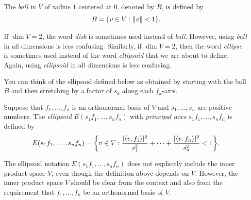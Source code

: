 \begin{definition}[Ball, $B$]\label{ax:7.95}
The \emph{ball} in $V$ of radius $1$ centered at $0$, denoted by $B$, is
defined by
\[ B = \{v\in V : \lVert v \rVert<1\}. \]
\end{definition}

%
If $\dim V=2$, the word \emph{disk} is sometimes used instead of \emph{ball}.
However, using \emph{ball} in all dimensions is less confusing. Similarly, if
$\dim V=2$, then the word \emph{ellipse} is sometimes used instead of the word
\emph{ellipsoid} that we are about to define. Again, using \emph{ellipsoid} in
all dimensions is less confusing.

You can think of the ellipsoid defined below as obtained by starting with the
ball $B$ and then stretching by a factor of $s_k$ along each $f_k$-axis.

\begin{definition}\label{ax:7.96}
Suppose that $f_1,\dots,f_n$ is an orthonormal basis of $V$ and
$s_1,\dots,s_n$ are positive numbers. The \emph{ellipsoid}
$E(s_1f_1,\dots,s_nf_n)$ with \emph{principal axes} $s_1f_1,\dots,s_nf_n$ is
defined by
\[ E(s_1f_1,\dots,s_nf_n) = \biggl\{v\in V :
   \frac{\lvert \langle v, f_1 \rangle \rvert^2}{s_1^2}+\cdots+\frac{\lvert \langle v, f_n \rangle \rvert^2}{s_n^2}<1
   \biggr\}. \]
\end{definition}

The ellipsoid notation $E(s_1f_1,\dots,s_nf_n)$ does not explicitly include the
inner product space $V$, even though the definition above depends on $V$.
However, the inner product space $V$ should be clear from the context and also
from the requirement that $f_1,\dots,f_n$ be an orthonormal basis of $V$.

